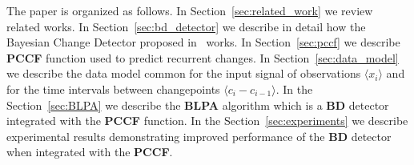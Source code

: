The paper is organized as follows.
In Section~\ref{sec:related_work} we review related works.
In Section~\ref{sec:bd_detector} we describe in detail how the Bayesian Change Detector proposed in~\cite{mackay2007} works.
In Section~\ref{sec:pccf} we describe \textbf{PCCF} function used to predict recurrent changes.
In Section~\ref{sec:data_model} we describe the data model common for the  input signal of observations
$\langle x_i \rangle$
and for the time intervals between changepoints
$\langle c_i - c_{i-1} \rangle$.
%
In the Section~\ref{sec:BLPA} we describe the \textbf{BLPA} algorithm which is a \textbf{BD} detector integrated with the \textbf{PCCF} function.
%
In the Section~\ref{sec:experiments} we describe experimental results demonstrating improved performance of the \textbf{BD} detector when integrated with the \textbf{PCCF}.
%
%
%
%
%
%
%
%
%
%

